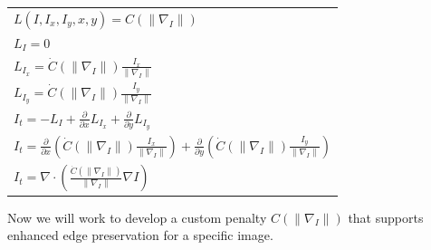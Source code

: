 \documentclass{article}
\begin{document}
  \begin{center}
    \begin{tabular}{l}
      \vspace{12pt}
      $L(I,I_{x},I_{y},x,y) = C(\| \nabla_{I} \|)$\\
      \vspace{12pt}
      $L_{I} = 0$\\
      \vspace{12pt}
      $L_{I_{x}} = \dot{C}(\| \nabla_{I} \|) \frac{I_{x}}{\| \nabla_{I} \|}$\\
      \vspace{12pt}
      $L_{I_{y}} = \dot{C}(\| \nabla_{I} \|) \frac{I_{y}}{\| \nabla_{I} \|}$\\
      \vspace{12pt}
      $I_{t} = -L_{I} + \frac{\partial}{\partial x}L_{I_{x}} + \frac{\partial}{\partial y}L_{I_{y}}$\\
      \vspace{12pt}
      $I_{t} = \frac{\partial}{\partial x}(\dot{C}(\| \nabla_{I} \|) \frac{I_{x}}{\| \nabla_{I} \|}) + \frac{\partial}{\partial y}(\dot{C}(\| \nabla_{I} \|) \frac{I_{y}}{\| \nabla_{I} \|})$\\
      \vspace{12pt}
      $I_{t} = \nabla \cdot (\frac {\dot{C}(\| \nabla_{I} \|)}{\| \nabla_{I} \|} \nabla I)$
    \end{tabular}
  \end{center}

  \noindent
  Now we will work to develop a custom penalty $C(\| \nabla_{I}\|)$ that supports
  enhanced edge preservation for a specific image.

  \newpage
\end{document}
